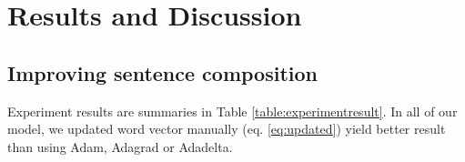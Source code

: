 \hypertarget{chap:result}{\chapter{Results and Discussion}}\label{result-discuss}


\section{Improving sentence composition}
Experiment results are summaries in Table \ref{table:experimentresult}. In all of our model, we updated word vector manually (eq. \ref{eq:updated}) yield better result than using Adam, Adagrad or Adadelta.


